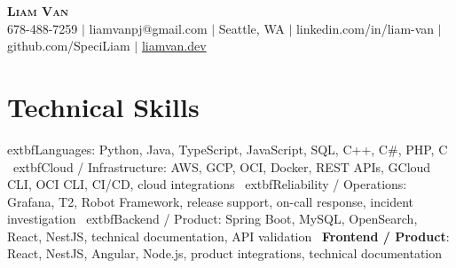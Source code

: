 \documentclass[letterpaper,11pt]{article}
\begin{document}

%
\begin{center}
    \textbf{\Huge \scshape Liam Van} \\ \vspace{1pt}
    \small 678-488-7259 $|$ \small {liamvanpj@gmail.com} $|$ Seattle, WA
 {{$|$ linkedin.com/in/liam-van} {$|$ github.com/SpeciLiam} {$|$ \href{https://liamvan.dev}{liamvan.dev}}}

\end{center}

\section{Technical Skills}
 \begin{itemize}[leftmargin=0.15in, label={}]
    \small{\item{
     	extbf{Languages}{: Python, Java, TypeScript, JavaScript, SQL, C++, C\#, PHP, C} \
     	extbf{Cloud / Infrastructure}{: AWS, GCP, OCI, Docker, REST APIs, GCloud CLI, OCI CLI, CI/CD, cloud integrations} \
     	extbf{Reliability / Operations}{: Grafana, T2, Robot Framework, release support, on-call response, incident investigation} \
     	extbf{Backend / Product}{: Spring Boot, MySQL, OpenSearch, React, NestJS, technical documentation, API validation} \
     \textbf{Frontend / Product}{: React, NestJS, Angular, Node.js, product integrations, technical documentation} \\
    }}
 \end{itemize}
%

\end{document}
